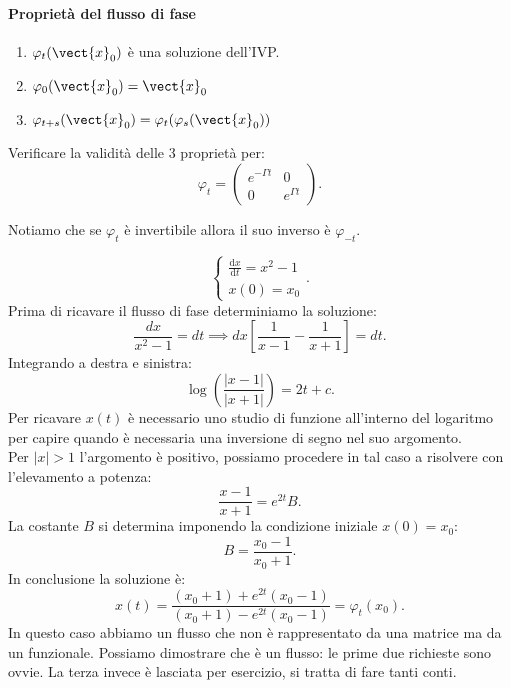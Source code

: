 \paragraph{Proprietà del flusso di fase}%
\label{par:Proprietà del flusso di fase}
\begin{enumerate}
    \item $\varphi_t(\vect{x}_0)$ è una soluzione dell'IVP.
    \item $\varphi_0(\vect{x}_0) = \vect{x}_0$ 
    \item $\varphi_{t+s}(\vect{x}_0)=\varphi_t(\varphi_s(\vect{x}_0))$ 
\end{enumerate}
\begin{ex}
    Verificare la validità delle 3 proprietà per:
    \[
        \varphi_t = 
	\begin{pmatrix} 
	    e^{-\Gamma t} & 0 \\
	    0 & e^{\Gamma t} 
        \end{pmatrix} 
    .\] 
\end{ex}
\noindent
Notiamo che se $\varphi_t$  è invertibile allora il suo inverso è $\varphi_{-t}$.  
\begin{exmp}
    \[
        \begin{cases}
            \frac{\text{d} x}{\text{d} t} = x^2-1\\
	    x(0) = x_0
        \end{cases}
    .\] 
    Prima di ricavare il flusso di fase determiniamo la soluzione:
    \[
        \frac{dx}{x^2-1} = dt \implies  dx \left[\frac{1}{x-1}-\frac{1}{x+1}\right] = dt
    .\] 
    Integrando a destra e sinistra:
    \[
	\log (\frac{\left|x-1\right|}{\left|x+1\right|}) = 2t + c
    .\] 
    Per ricavare $x(t)$  è necessario uno studio di funzione all'interno del logaritmo per capire quando è necessaria una inversione di segno nel suo argomento.\\
    Per $\left|x\right| > 1$  l'argomento è positivo, possiamo procedere in tal caso a risolvere con l'elevamento a potenza:
    \[
        \frac{x-1}{x+1}=e^{2t}B
    .\] 
    La costante $B$  si determina imponendo la condizione iniziale $x(0)=x_0$:
    \[
        B=\frac{x_0-1}{x_0+1}
    .\] 
    In conclusione la soluzione è:
    \[
	x(t) = \frac{(x_0+1)+e^{2t}(x_0-1)}{(x_0+1) -e^{2t}(x_0-1)} = \varphi_t(x_0)
    .\] 
    In questo caso abbiamo un flusso che non è rappresentato da una matrice ma da un funzionale. Possiamo dimostrare che è un flusso: le prime due richieste sono ovvie. La terza invece è lasciata per esercizio, si tratta di fare tanti conti.
\end{exmp}
\noindent
